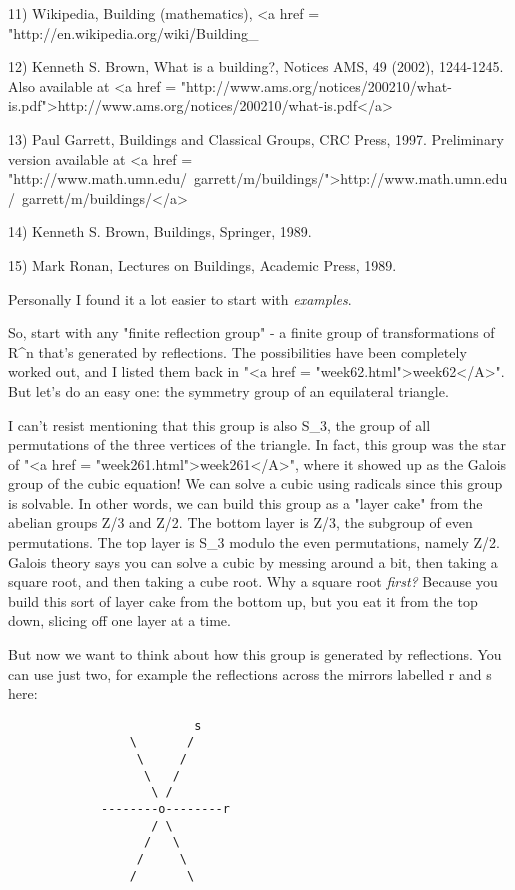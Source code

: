 11) Wikipedia, Building (mathematics),
<a href = "http://en.wikipedia.org/wiki/Building_%

12) Kenneth S. Brown, What is a building?, Notices AMS, 49 
(2002), 1244-1245.  Also available at 
<a href = "http://www.ams.org/notices/200210/what-is.pdf">http://www.ams.org/notices/200210/what-is.pdf</a>

13) Paul Garrett, Buildings and Classical Groups, CRC Press,
1997.  Preliminary version available at 
<a href = "http://www.math.umn.edu/~garrett/m/buildings/">http://www.math.umn.edu/~garrett/m/buildings/</a>

14) Kenneth S. Brown, Buildings, Springer, 1989.

15) Mark Ronan, Lectures on Buildings, Academic Press, 1989.

Personally I found it a lot easier to start with \emph{examples}.

So, start with any "finite reflection group" - a finite
group of transformations of R^{n} that's generated by reflections.  The
possibilities have been completely worked out, and I listed them back
in "<a href = "week62.html">week62</A>".  But let's do an
easy one: the symmetry group of an equilateral triangle.

I can't resist mentioning that this group is also S_{3}, the
group of all permutations of the three vertices of the triangle.  In
fact, this group was the star of "<a href =
"week261.html">week261</A>", where it showed up as the Galois
group of the cubic equation!  We can solve a cubic using radicals
since this group is solvable.  In other words, we can build this group
as a "layer cake" from the abelian groups Z/3 and Z/2.  The
bottom layer is Z/3, the subgroup of even permutations.  The top layer
is S_{3} modulo the even permutations, namely Z/2.  Galois
theory says you can solve a cubic by messing around a bit, then taking
a square root, and then taking a cube root.  Why a square root
\emph{first?}  Because you build this sort of layer cake from the bottom
up, but you eat it from the top down, slicing off one layer at a time.

But now we want to think about how this group is generated by 
reflections.  You can use just two, for example the reflections 
across the mirrors labelled r and s here:

\begin{verbatim}
                          s 
                 \       /
                  \     /
                   \   /
                    \ /
             --------o--------r
                    / \
                   /   \
                  /     \
                 /       \
\end{verbatim}
    
